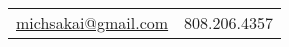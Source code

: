 \documentclass[11pt]{article} %
\begin{document}
\setlength{\parskip}{\baselineskip}%
\pagestyle{empty} %



\begin{center}
	\\%
	\noindent\begin{tabular}{r @{$\quad\bullet\quad$} l}
		\href{mailto:michsakai@gmail.com}{michsakai@gmail.com} & 808.206.4357
	\end{tabular}
\end{center}

%


%
\end{document}
